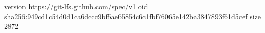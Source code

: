 version https://git-lfs.github.com/spec/v1
oid sha256:949cd1c54d0d1ca6dccc9bf5ae65854c6c1fbf76065e142ba3847893f61d5cef
size 2872
